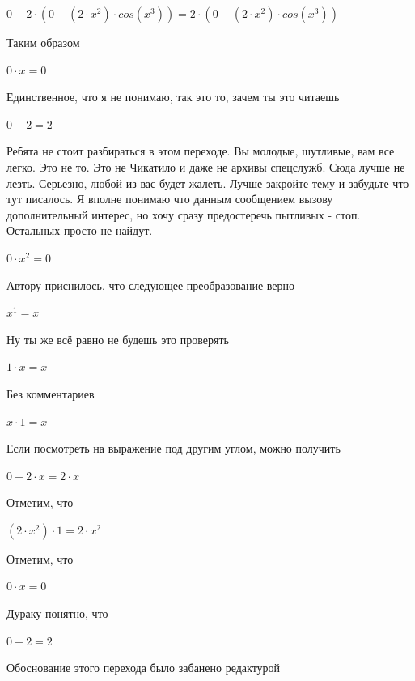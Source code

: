 \documentclass[12pt,a4paper,fleqn]{article}
\begin{document}
\begin{center}
$0+2 \cdot (0-(2 \cdot x^{2}) \cdot cos(x^{3})) = 2 \cdot (0-(2 \cdot x^{2}) \cdot cos(x^{3}))$\end{center}
Таким образом

\begin{center}
$0 \cdot x = 0$\end{center}
Единственное, что я не понимаю, так это то, зачем ты это читаешь

\begin{center}
$0+2 = 2$\end{center}
Ребята не стоит разбираться в этом переходе. Вы молодые, шутливые, вам все легко. Это не то. Это не Чикатило и даже не архивы спецслужб. Сюда лучше не лезть. Серьезно, любой из вас будет жалеть. Лучше закройте тему и забудьте что тут писалось. Я вполне понимаю что данным сообщением вызову дополнительный интерес, но хочу сразу предостеречь пытливых - стоп. Остальных просто не найдут.

\begin{center}
$0 \cdot x^{2} = 0$\end{center}
Автору приснилось, что следующее преобразование верно

\begin{center}
$x^{1} = x$\end{center}
Ну ты же всё равно не будешь это проверять

\begin{center}
$1 \cdot x = x$\end{center}
Без комментариев\cite{link4}

\begin{center}
$x \cdot 1 = x$\end{center}
Если посмотреть на выражение под другим углом, можно получить

\begin{center}
$0+2 \cdot x = 2 \cdot x$\end{center}
Отметим, что

\begin{center}
$(2 \cdot x^{2}) \cdot 1 = 2 \cdot x^{2}$\end{center}
Отметим, что

\begin{center}
$0 \cdot x = 0$\end{center}
Дураку понятно, что

\begin{center}
$0+2 = 2$\end{center}
Обоснование этого перехода было забанено редактурой
\end{document}
